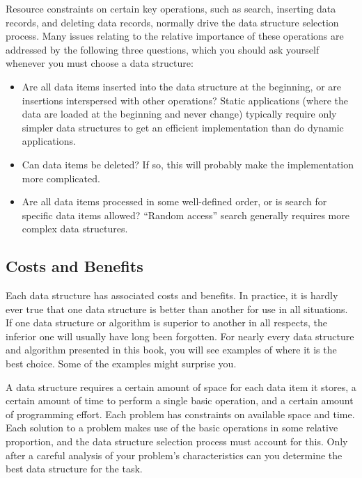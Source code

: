 Resource constraints on certain key operations, such as search,
inserting data records, and deleting data records, normally drive
the data structure selection process.
Many issues relating to the relative importance of these operations
are addressed by the following three questions, which you should ask
yourself whenever you must choose a data structure:

\begin{itemize}

\item
Are all data items inserted into the data structure at
the beginning, or are insertions interspersed with other operations?
Static applications (where the data are loaded at the beginning and
never change) typically require only simpler data structures to get an
efficient implementation than do dynamic applications.

\item
Can data items be deleted?
If so, this will probably make the implementation more complicated.

\item
Are all data items processed in some well-defined order,
or is search for specific data items allowed?
``Random access'' search generally requires more complex data
structures.

\end{itemize}


\subsection{Costs and Benefits}

Each data structure has associated costs and benefits.
In practice, it is hardly ever true that one data structure is
better than another for use in all situations.
If one data structure or algorithm is superior to another in all
respects, the inferior one will usually have long been forgotten.
For nearly every data structure and algorithm presented in this book,
you will see examples of where it is the best choice.
Some of the examples might surprise you.

A data structure requires a certain amount of
space for each data item it stores,
a certain amount of time to perform a single
basic 
operation, and a certain amount of programming effort.
Each problem has constraints on available space and
time.
Each solution to a problem makes use of the basic operations in some
relative proportion, and the data structure selection process
must account for this.
Only after a careful analysis of your problem's characteristics can
you determine the best data structure for the task.

